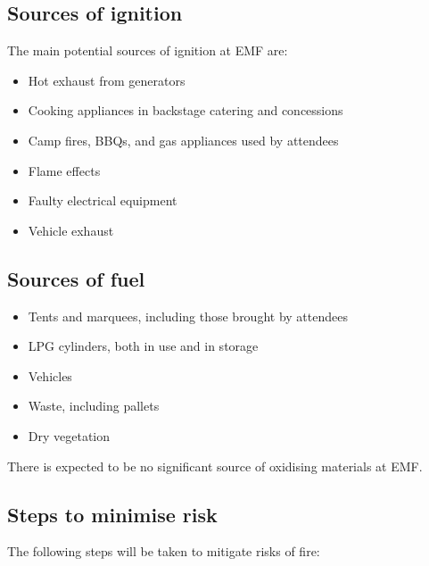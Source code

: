 \subsection{Sources of ignition}

The main potential sources of ignition at EMF are:

\begin{itemize}
\tightlist
\item Hot exhaust from generators
\item Cooking appliances in backstage catering and concessions
\item Camp fires, BBQs, and gas appliances used by attendees
\item Flame effects
\item Faulty electrical equipment
\item Vehicle exhaust
\end{itemize}

\subsection{Sources of fuel}
\begin{itemize}
\tightlist
\item Tents and marquees, including those brought by attendees
\item LPG cylinders, both in use and in storage
\item Vehicles
\item Waste, including pallets
\item Dry vegetation
\end{itemize}

There is expected to be no significant source of oxidising materials at EMF.

\subsection{Steps to minimise risk}
The following steps will be taken to mitigate risks of fire:

